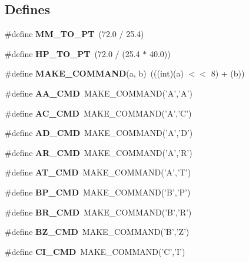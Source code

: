 \subsection*{Defines}
\begin{DoxyCompactItemize}
\item 
\#define {\bfseries MM\_\-TO\_\-PT}~(72.0 / 25.4)\label{hpgsreader_8h_a0819501dbaaaafbee07073554f276b65}

\item 
\#define {\bfseries HP\_\-TO\_\-PT}~(72.0 / (25.4 $\ast$ 40.0))\label{hpgsreader_8h_a63d937b5a3ae35e7f6a6e73b323d4f49}

\item 
\#define {\bfseries MAKE\_\-COMMAND}(a, b)~(((int)(a) $<$$<$ 8) + (b))\label{hpgsreader_8h_a91791e99c63cc542fdbaad05b341aff9}

\item 
\#define {\bfseries AA\_\-CMD}~MAKE\_\-COMMAND('A','A')\label{hpgsreader_8h_ab6b399d9cb7fdd99b09e8546f89ab737}

\item 
\#define {\bfseries AC\_\-CMD}~MAKE\_\-COMMAND('A','C')\label{hpgsreader_8h_af4269d5f9a7846aed0b3428c682ea73b}

\item 
\#define {\bfseries AD\_\-CMD}~MAKE\_\-COMMAND('A','D')\label{hpgsreader_8h_a23e3ee2da83f429b7f3087d3ff8506b8}

\item 
\#define {\bfseries AR\_\-CMD}~MAKE\_\-COMMAND('A','R')\label{hpgsreader_8h_a15ed5c6b0904db067dd812547e9323f3}

\item 
\#define {\bfseries AT\_\-CMD}~MAKE\_\-COMMAND('A','T')\label{hpgsreader_8h_a5209e58cb4b467793fa1f2343afad77a}

\item 
\#define {\bfseries BP\_\-CMD}~MAKE\_\-COMMAND('B','P')\label{hpgsreader_8h_a4ffb85aa406671daafc5fff662e7aa76}

\item 
\#define {\bfseries BR\_\-CMD}~MAKE\_\-COMMAND('B','R')\label{hpgsreader_8h_a501f74bb295f6c7f7838f9775824c032}

\item 
\#define {\bfseries BZ\_\-CMD}~MAKE\_\-COMMAND('B','Z')\label{hpgsreader_8h_a59cffa12dba6d8af2c830f2e28982b91}

\item 
\#define {\bfseries CI\_\-CMD}~MAKE\_\-COMMAND('C','I')\label{hpgsreader_8h_ae286c7001d99f82c8fad55006953fe2a}


\end{DoxyCompactItemize}

